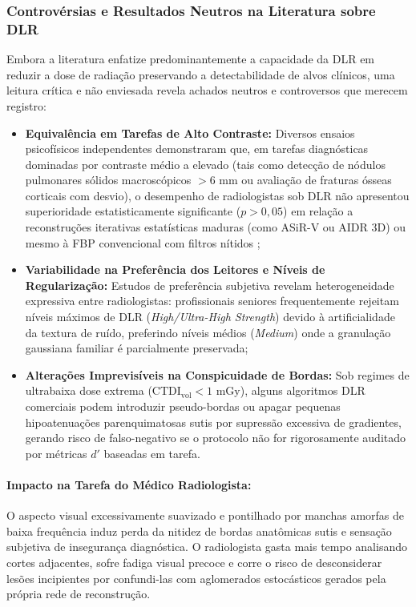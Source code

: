 \documentclass[
  12pt,
  a4paper,
  oneside
]{report}
\begin{document}
\subsubsection{Controvérsias e Resultados Neutros na Literatura sobre DLR}
\label{subsubsec:controversias_dlr}
Embora a literatura enfatize predominantemente a capacidade da DLR em reduzir a dose de radiação preservando a detectabilidade de alvos clínicos, uma leitura crítica e não enviesada revela achados neutros e controversos que merecem registro:
\begin{itemize}
  \item \textbf{Equivalência em Tarefas de Alto Contraste:} Diversos ensaios psicofísicos independentes demonstraram que, em tarefas diagnósticas dominadas por contraste médio a elevado (tais como detecção de nódulos pulmonares sólidos macroscópicos $> 6\text{ mm}$ ou avaliação de fraturas ósseas corticais com desvio), o desempenho de radiologistas sob DLR não apresentou superioridade estatisticamente significante ($p > 0{,}05$) em relação a reconstruções iterativas estatísticas maduras (como ASiR-V ou AIDR 3D) ou mesmo à FBP convencional com filtros nítidos \cite{solomon2020, greffier2026};
  \item \textbf{Variabilidade na Preferência dos Leitores e Níveis de Regularização:} Estudos de preferência subjetiva revelam heterogeneidade expressiva entre radiologistas: profissionais seniores frequentemente rejeitam níveis máximos de DLR (\emph{High/Ultra-High Strength}) devido à artificialidade da textura de ruído, preferindo níveis médios (\emph{Medium}) onde a granulação gaussiana familiar é parcialmente preservada;
  \item \textbf{Alterações Imprevisíveis na Conspicuidade de Bordas:} Sob regimes de ultrabaixa dose extrema ($\text{CTDI}_{\text{vol}} < 1\text{ mGy}$), alguns algoritmos DLR comerciais podem introduzir pseudo-bordas ou apagar pequenas hipoatenuações parenquimatosas sutis por supressão excessiva de gradientes, gerando risco de falso-negativo se o protocolo não for rigorosamente auditado por métricas $d'$ baseadas em tarefa.
\end{itemize}

\paragraph{Impacto na Tarefa do Médico Radiologista:} O aspecto visual excessivamente suavizado e pontilhado por manchas amorfas de baixa frequência induz perda da nitidez de bordas anatômicas sutis e sensação subjetiva de insegurança diagnóstica. O radiologista gasta mais tempo analisando cortes adjacentes, sofre fadiga visual precoce e corre o risco de desconsiderar lesões incipientes por confundi-las com aglomerados estocásticos gerados pela própria rede de reconstrução.
\end{document}
